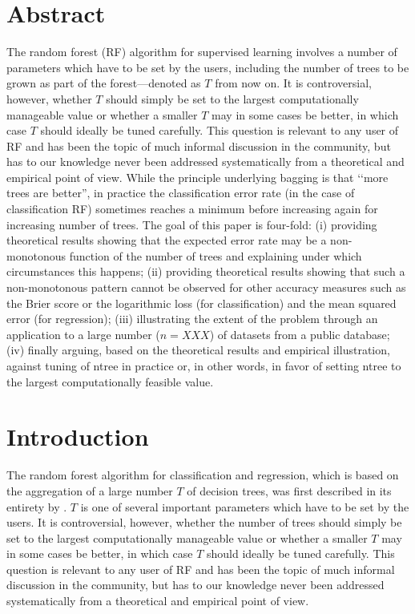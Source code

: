 \documentclass[paper=a4
               ,12pt
               ,DIV=12
               ,parskip=half
               ,titlepage=on
               ,headinclude 
               ,footinclude
               ,headsepline
               ,footsepline         %
               ,ilines 
               ]{scrartcl}
\begin{document}
\section*{Abstract}
The random forest (RF) algorithm for supervised learning involves a number of parameters which have to be set by the users, including the number of trees to be grown as part of the forest---denoted as $T$ from now on. 
It is controversial, however, whether $T$ should simply be set to the largest computationally manageable value or whether a smaller $T$ may in some cases be better, in which case $T$ should ideally be 
tuned carefully. This question is relevant to any user of RF and has been the topic of much informal discussion in the community, but has to our knowledge never been addressed systematically from a theoretical and empirical 
point of view. While the principle underlying bagging is that \lq\lq more trees are better'', in practice the classification error rate (in the case of classification RF) sometimes reaches a minimum before increasing 
again for increasing number of trees. 
The goal of this paper is four-fold: (i) providing theoretical results showing that the expected error rate may be a non-monotonous function of the number of trees and explaining under which circumstances this happens; 
(ii) providing theoretical results showing that such a non-monotonous pattern cannot be observed for other accuracy measures such as the Brier score or the logarithmic loss (for classification) and the mean squared error 
(for regression); (iii) illustrating the extent of the problem through an application to a large number ($n=XXX$) of datasets from a public database; (iv) finally arguing, based on the theoretical results and empirical illustration, 
against tuning of ntree in practice or, in other words, in favor of setting ntree to the largest computationally feasible value.


\section{Introduction}

The random forest algorithm for classification and regression, which is based on the aggregation of a large number $T$ of decision trees, was first described in its entirety by \citet{Breiman2001}. $T$ is one of several 
important parameters which have to be set by the users. It is controversial, however, whether the number of trees should simply be set to the largest computationally manageable value or whether a smaller $T$ may in some 
cases be better, in which case $T$ should ideally be tuned carefully. This question is relevant to any user of RF and has been the topic of much informal discussion in the community, but has to our knowledge never been 
addressed systematically from a theoretical and empirical point of view.
\end{document}
